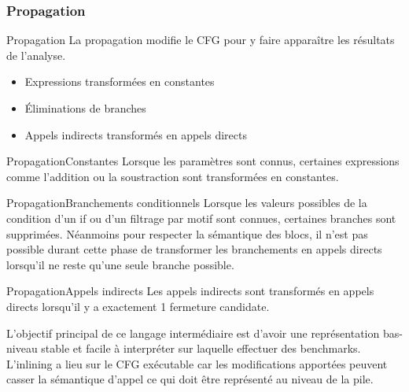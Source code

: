 \documentclass{beamer}
\begin{document}
\subsubsection{Propagation}


\begin{frame}{Propagation}
    La propagation modifie le CFG pour y faire apparaître les résultats de l'analyse.

    \begin{itemize}
        \item Expressions transformées en constantes
        \item Éliminations de branches
        \item Appels indirects transformés en appels directs
    \end{itemize}
\end{frame}

\begin{frame}{Propagation}{Constantes}
    Lorsque les paramètres sont connus, certaines expressions comme l'addition ou la soustraction sont transformées en constantes.
\end{frame}

\begin{frame}{Propagation}{Branchements conditionnels}
    Lorsque les valeurs possibles de la condition d'un if ou d'un filtrage par motif sont connues, certaines branches sont supprimées. Néanmoins pour respecter la sémantique des blocs, il n'est pas possible durant cette phase de transformer les branchements en appels directs lorsqu'il ne reste qu'une seule branche possible.
\end{frame}

\begin{frame}{Propagation}{Appels indirects}
    Les appels indirects sont transformés en appels directs lorsqu'il y a exactement 1 fermeture candidate.
\end{frame}

L'objectif principal de ce langage intermédiaire est d'avoir une représentation bas-niveau stable et facile à interpréter sur laquelle effectuer des benchmarks. L'inlining a lieu sur le CFG exécutable car les modifications apportées peuvent casser la sémantique d'appel ce qui doit être représenté au niveau de la pile.
\end{document}
